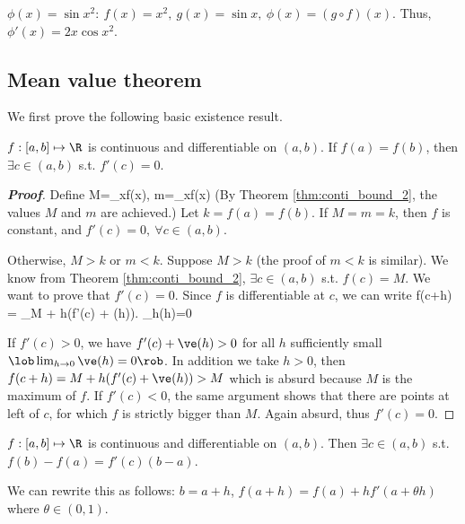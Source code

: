 \begin{example}
$\phi(x)=\sin x^2: \ f(x)=x^2, \ g(x)=\sin x,\ \phi(x) = (g\circ f)(x)$. Thus, $\phi'(x) = 2x \cos x^2$.
\end{example}



\subsection{Mean value theorem}

We first prove the following basic existence result.

\begin{theorem}\label{thm:rolle_analysis}
$f: [a,b]\mapsto \R$ is continuous and differentiable on $(a,b)$. If $f(a)=f(b)$, then $\exists c\in (a,b)$ s.t. $f'(c)=0$.
\end{theorem}

\begin{proof}[{\bf Proof}]
Define 
\be
M=\max_{x\in[a,b]}f(x), \quad m=\min_{x\in[a,b]}f(x)
\ee
(By Theorem \ref{thm:conti_bound_2}, the values $M$ and $m$ are achieved.) Let $k=f(a)=f(b)$. If $M=m=k$, then $f$ is constant, and $f'(c)=0,\ \forall c\in(a,b)$.

Otherwise, $M>k$ or $m<k$. Suppose $M>k$ (the proof of $m<k$ is similar). We know from Theorem \ref{thm:conti_bound_2}, $\exists c\in(a,b)$ s.t. $f(c)=M$. We want to prove that $f'(c)=0$. Since $f$ is differentiable at $c$, we can write
\be
f(c+h) = _{M} + h(f'(c) + \ve(h)). \quad \lob \lim_{h}\ve(h)=0\rob 
\ee

If $f'(c)>0$, we have $f'(c) + \ve(h)>0$ for all $h$ sufficiently small $\lob \lim_{h\to 0}\ve(h)=0\rob $. In addition we take $h>0$, then $f(c+h) = M + h(f'(c) + \ve(h)) > M$ which is absurd because $M$ is the maximum of $f$. If $f'(c)<0$, the same argument shows that there are points at left of $c$, for which $f$ is strictly bigger than $M$. Again absurd, thus $f'(c)=0$.
\end{proof}

\begin{theorem}\label{thm:mean_value}
$f: [a,b]\mapsto \R$ is continuous and differentiable on $(a,b)$. Then $\exists c \in (a,b)$ s.t. $f(b)-f(a)=f'(c)(b-a)$.
\end{theorem}

\begin{remark}
We can rewrite this as follows: $b=a+h$, $f(a+h)=f(a)+hf'(a+\theta h)$ where $\theta\in(0,1)$.
\end{remark}

